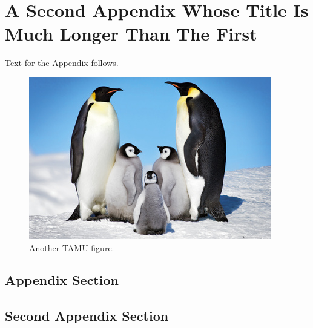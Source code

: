 

\chapter{A Second Appendix Whose Title Is Much Longer Than The First}\label{appendix:02}

Text for the Appendix follows.

\begin{figure}[h]
\centering
\includegraphics[scale=.50]{figures/Penguins.jpg}
\caption{Another TAMU figure.}
\label{fig:tamu-fig6}
\end{figure}

\section{Appendix Section}

\section{Second Appendix Section}